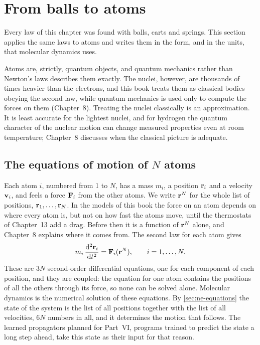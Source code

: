 \section{From balls to atoms}
\label{sec:ne-atoms}

Every law of this chapter was found with balls, carts and springs. This
section applies the same laws to atoms and writes them in the form, and in
the units, that molecular dynamics uses.

Atoms are, strictly, quantum objects, and quantum mechanics rather than
Newton's laws describes them exactly. The nuclei, however, are thousands
of times heavier than the electrons, and this book treats them as
classical bodies obeying the second law, while quantum mechanics is used
only to compute the forces on them (Chapter~8). Treating the nuclei
classically is an approximation. It is least accurate for the lightest
nuclei, and for hydrogen the quantum character of the nuclear motion can
change measured properties even at room temperature; Chapter~8 discusses
when the classical picture is adequate.

\subsection*{The equations of motion of $N$ atoms}

Each atom $i$, numbered from 1 to $N$, has a mass $m_i$, a position
$\bm{\mathrm{r}}_i$ and a velocity $\bm{\mathrm{v}}_i$, and feels a force $\bm{\mathrm{F}}_i$ from
the other atoms. We write $\bm{\mathrm{r}}^N$ for the whole list of positions,
$\bm{\mathrm{r}}_1, \dots, \bm{\mathrm{r}}_N$. In the models of this book the force on an
atom depends on where every atom is, but not on how fast the atoms move,
until the thermostats of Chapter~13 add a drag. Before then it is a
function of $\bm{\mathrm{r}}^N$ alone, and Chapter~8 explains where it comes
from. The second law for each atom gives
\begin{equation}
   m_i\,\frac{\mathrm{d}^2\bm{\mathrm{r}}_i}{\mathrm{d} t^2} = \bm{\mathrm{F}}_i(\bm{\mathrm{r}}^N),
   \qquad i = 1, \dots, N .
   \label{eq:ne-eom-atoms}
\end{equation}
These are $3N$ second-order differential equations, one for each
component of each position, and they are coupled: the equation for one
atom contains the positions of all the others through its force, so none
can be solved alone. Molecular dynamics is the numerical solution of these
equations. By \cref{sec:ne-equations} the state of the system is the list
of all positions together with the list of all velocities, $6N$ numbers
in all, and it determines the motion that follows. The learned
propagators planned for Part~VI, programs trained to predict the state a long
step ahead, take this state as their input for that reason.

